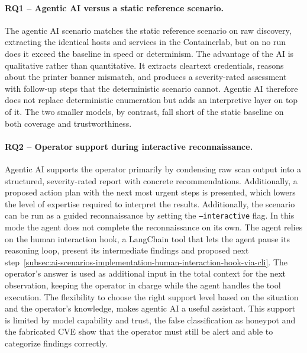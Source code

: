 \paragraph{RQ1 -- Agentic AI versus a static reference scenario.}
The agentic \gls{AI} scenario matches the static reference scenario on raw discovery, extracting the identical hosts and
services in the \gls{Containerlab}, but on no run does it exceed the baseline in speed or determinism.
The advantage of the \gls{AI} is qualitative rather than quantitative.
It extracts cleartext credentials, reasons about the printer banner mismatch, and produces a severity-rated assessment
with follow-up steps that the deterministic scenario cannot.
Agentic \gls{AI} therefore does not replace deterministic enumeration but adds an interpretive layer on top of it.
The two smaller models, by contrast, fall short of the static baseline on both coverage and trustworthiness.


\paragraph{RQ2 -- Operator support during interactive reconnaissance.}
Agentic \gls{AI} supports the operator primarily by condensing raw scan output into a structured, severity-rated report with concrete recommendations.
Additionally, a proposed action plan with the next most urgent steps is presented, which lowers the level of expertise required to interpret the results.
Additionally, the scenario can be run as a guided reconnaissance by setting the \texttt{--interactive} flag.
In this mode the agent does not complete the reconnaissance on its own.
The agent relies on the human interaction hook, a \gls{LangChain} tool that lets the agent pause its reasoning loop, present its intermediate findings and proposed next step~\ref{subsec:ai-scenarios-implementation-human-interaction-hook-via-cli}.
The operator's answer is used as additional input in the total context for the next observation, keeping the operator in charge while the agent handles the tool execution.
The flexibility to choose the right support level based on the situation and the operator's knowledge, makes agentic \gls{AI} a useful assistant.
This support is limited by model capability and trust, the false classification as honeypot and the fabricated \gls{CVE} show that the operator must still be alert and able to categorize findings correctly.

